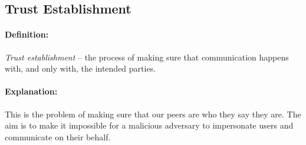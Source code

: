 \documentclass[a4paper, 12pt]{report}
\begin{document}

\subsection{Trust Establishment}
\paragraph{Definition:} \hspace{-8pt} 
\textit{Trust establishment} -- the process of making sure that communication happens with, and only with, the intended parties.

\paragraph{Explanation:}  \hspace{-8pt} 
This is the problem of making sure that our peers are who they say they are. The aim is to make it impossible for a malicious adversary to impersonate users and communicate on their behalf.
\end{document}
